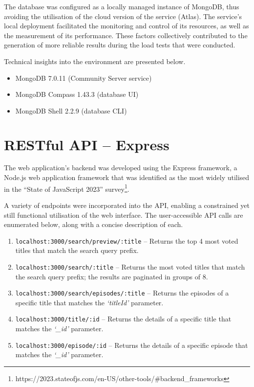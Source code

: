 The database was configured as a locally managed instance of MongoDB, thus avoiding the utilisation of the cloud version of the service (Atlas).
The service's local deployment facilitated the monitoring and control of its resources, as well as the measurement of its performance.
These factors collectively contributed to the generation of more reliable results during the load tests that were conducted.

Technical insights into the environment are presented below.

\begin{itemize}
	\item MongoDB 7.0.11 (Community Server service)
	\item MongoDB Compass 1.43.3 (database UI)
	\item MongoDB Shell 2.2.9 (database CLI)
\end{itemize}

\section{RESTful API -- Express}

The web application's backend was developed using the Express framework, a Node.js web application framework that was identified as the most widely utilised in the ``State of JavaScript 2023'' survey\footnote[3]{https://2023.stateofjs.com/en-US/other-tools/\#backend\_frameworks}.

A variety of endpoints were incorporated into the API, enabling a constrained yet still functional utilisation of the web interface.
The user-accessible API calls are enumerated below, along with a concise description of each.

\begin{enumerate}
	\item \verb|localhost:3000/search/preview/:title| -- Returns the top 4 most voted titles that match the search query prefix.
	\item \verb|localhost:3000/search/:title| -- Returns the most voted titles that match the search query prefix; the results are paginated in groups of 8.
	\item \verb|localhost:3000/search/episodes/:title| -- Returns the episodes of a specific title that matches the \textit{`titleId'} parameter.
	\item \verb|localhost:3000/title/:id| -- Returns the details of a specific title that matches the \textit{`\_id'} parameter.
	\item \verb|localhost:3000/episode/:id| -- Returns the details of a specific episode that matches the \textit{`\_id'} parameter.
\end{enumerate}

